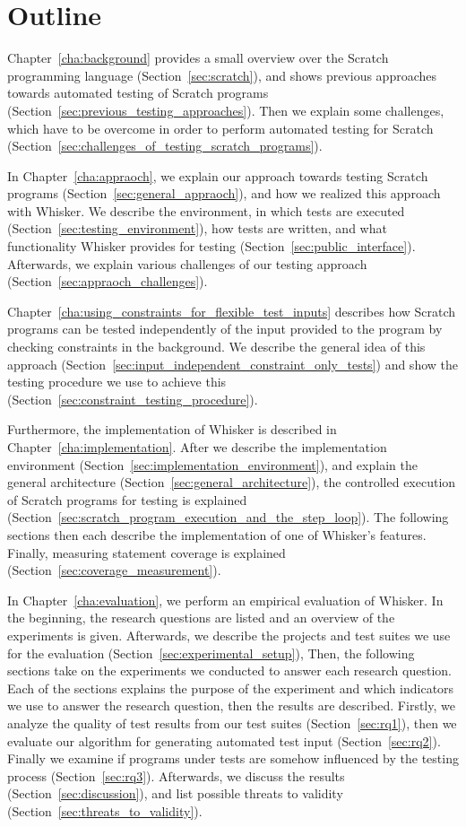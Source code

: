 \section{Outline}

Chapter~\ref{cha:background} provides a small overview over the Scratch programming language (Section~\ref{sec:scratch}),
and shows previous approaches towards automated testing of Scratch programs (Section~\ref{sec:previous_testing_approaches}).
Then we explain some challenges, which have to be overcome in order to perform automated testing for Scratch (Section~\ref{sec:challenges_of_testing_scratch_programs}).
\parspace

In Chapter~\ref{cha:appraoch}, we explain our approach towards testing Scratch programs (Section~\ref{sec:general_appraoch}),
and how we realized this approach with Whisker.
We describe the environment, in which tests are executed (Section~\ref{sec:testing_environment}),
how tests are written, and what functionality Whisker provides for testing (Section~\ref{sec:public_interface}).
Afterwards, we explain various challenges of our testing approach (Section~\ref{sec:appraoch_challenges}).
\parspace

Chapter~\ref{cha:using_constraints_for_flexible_test_inputs} describes how Scratch programs can be tested
independently of the input provided to the program by checking constraints in the background.
We describe the general idea of this approach (Section~\ref{sec:input_independent_constraint_only_tests})
and show the testing procedure we use to achieve this (Section~\ref{sec:constraint_testing_procedure}).
\parspace

Furthermore, the implementation of Whisker is described in Chapter~\ref{cha:implementation}.
After we describe the implementation environment (Section~\ref{sec:implementation_environment}),
and explain the general architecture (Section~\ref{sec:general_architecture}),
the controlled execution of Scratch programs for testing is explained (Section~\ref{sec:scratch_program_execution_and_the_step_loop}).
The following sections then each describe the implementation of one of Whisker's features.
Finally, measuring statement coverage is explained (Section~\ref{sec:coverage_measurement}).
\parspace

In Chapter~\ref{cha:evaluation}, we perform an empirical evaluation of Whisker.
In the beginning, the research questions are listed and an overview of the experiments is given.
Afterwards, we describe the projects and test suites we use for the evaluation (Section~\ref{sec:experimental_setup}),
Then, the following sections take on the experiments we conducted to answer each research question.
Each of the sections explains the purpose of the experiment and which indicators we use to answer the research question,
then the results are described.
Firstly, we analyze the quality of test results from our test suites (Section~\ref{sec:rq1}),
then we evaluate our algorithm for generating automated test input (Section~\ref{sec:rq2}).
Finally we examine if programs under tests are somehow influenced by the testing process (Section~\ref{sec:rq3}).
Afterwards, we discuss the results (Section~\ref{sec:discussion}),
and list possible threats to validity (Section~\ref{sec:threats_to_validity}).
\parspace

